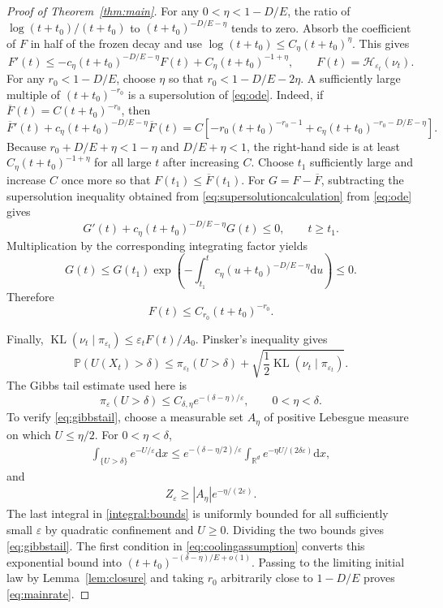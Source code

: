 \documentclass[11pt]{article}
\theoremstyle{definition}
\newcommand{\R}{\mathbb R}
\newcommand{\dd}{\mathrm d}
\newcommand{\KL}{\operatorname{KL}}
\newcommand{\cH}{\mathcal H}
\newcommand{\eps}{\varepsilon}
\begin{document}
\begin{proof}[Proof of Theorem~\ref{thm:main}]
For any $0<\eta<1-D/E$, the ratio of
$\log(t+t_0)/(t+t_0)$ to $(t+t_0)^{-D/E-\eta}$ tends to zero.
Absorb the coefficient of $F$ in half of the frozen decay and use
$\log(t+t_0)\leq C_\eta(t+t_0)^\eta$. This gives
\begin{equation}\label{eq:ode}
 F'(t)\leq-c_\eta(t+t_0)^{-D/E-\eta}F(t)
              +C_\eta(t+t_0)^{-1+\eta},
 \qquad F(t)=\cH_{\eps_t}(\nu_t).
\end{equation}
For any $r_0<1-D/E$, choose $\eta$ so that
$r_0<1-D/E-2\eta$. A sufficiently large multiple of
$(t+t_0)^{-r_0}$ is a supersolution of \eqref{eq:ode}. Indeed, if
$\overline F(t)=C(t+t_0)^{-r_0}$, then
\begin{equation}\label{eq:supersolutioncalculation}
 \overline F'(t)+c_\eta(t+t_0)^{-D/E-\eta}\overline F(t)
 ={C}\left[-r_0(t+t_0)^{-r_0-1}
 +c_\eta(t+t_0)^{-r_0-D/E-\eta}\right].
\end{equation}
Because $r_0+D/E+\eta<1-\eta$ and $D/E+\eta<1$, the right-hand side is at
least $C_\eta(t+t_0)^{-1+\eta}$ for all large $t$ after increasing $C$.
Choose $t_1$ sufficiently large and increase $C$ once more so that
$F(t_1)\leq\overline F(t_1)$. For $G=F-\overline F$, subtracting the
supersolution inequality obtained from
\eqref{eq:supersolutioncalculation} from \eqref{eq:ode}
gives
\[
 G'(t)+c_\eta(t+t_0)^{-D/E-\eta}G(t)\leq0,
 \qquad t\geq t_1.
\]
Multiplication by the corresponding integrating factor yields
\[
 G(t)\leq G(t_1)
 \exp\left(-\int_{t_1}^tc_\eta(u+t_0)^{-D/E-\eta}\dd u\right)\leq0.
\]
Therefore
\[
F(t)\leq C_{r_0}(t+t_0)^{-r_0}.
\]

Finally, $\KL(\nu_t\mid\pi_{\eps_t})\leq\eps_tF(t)/A_0$.
Pinsker's inequality gives
\[
 \mathbb P(U(X_t)>\delta)
 \leq\pi_{\eps_t}(U>\delta)
                   +\sqrt{\frac12\KL(\nu_t\mid\pi_{\eps_t})}.
\]
The Gibbs tail estimate used here is
\begin{equation}\label{eq:gibbstail}
 \pi_\eps(U>\delta)\leq C_{\delta,\eta}e^{-(\delta-\eta)/\eps},
 \qquad 0<\eta<\delta.
\end{equation}
To verify \eqref{eq:gibbstail}, choose a measurable set $A_\eta$ of positive
Lebesgue measure on which $U\leq\eta/2$. For $0<\eta<\delta$,
\begin{align}\label{integral:bounds}
 \int_{\{U>\delta\}}e^{-U/\eps}\dd x
 \leq e^{-(\delta-\eta/2)/\eps}
       \int_{\R^d}e^{-\eta U/(2\delta\eps)}\dd x,
\end{align}
and
\begin{align*}
 Z_\eps\geq |A_\eta|e^{-\eta/(2\eps)}.
\end{align*}
The last integral in \eqref{integral:bounds} is uniformly bounded for all sufficiently
small $\eps$ by quadratic confinement and $U\geq0$. Dividing the two bounds
gives \eqref{eq:gibbstail}.
The first condition in \eqref{eq:coolingassumption} converts this exponential
bound into $(t+t_0)^{-(\delta-\eta)/E+o(1)}$. Passing to the limiting initial
law by Lemma~\ref{lem:closure} and taking $r_0$ arbitrarily close to $1-D/E$
proves \eqref{eq:mainrate}.
\end{proof}
\end{document}
